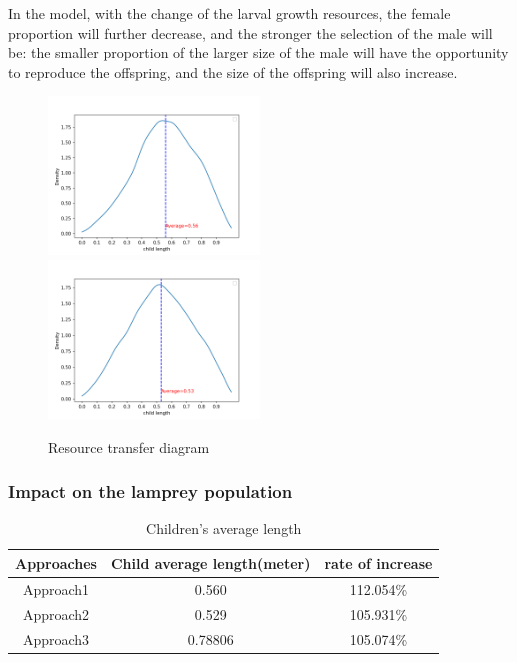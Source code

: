 \documentclass[12pt]{article}
\begin{document}
In the model, with the change of the larval growth resources, the female proportion will
further decrease, and the stronger the selection of the male will be: the smaller proportion
of the larger size of the male will have the opportunity to reproduce the offspring, and the
size of the offspring will also increase.
\begin{figure}[h]
	\centering
	\includegraphics[width=0.5\textwidth]{Q2_1.png}
	\includegraphics[width=0.5\textwidth]{Q2_2.png}

	\caption{Resource transfer diagram}
\end{figure}
\subsubsection{Impact on the lamprey population }
\begin{table}
	\centering
	\begin{tabular}{ |c |c |c|}
		\hline
		Approaches & Child average length(meter) & rate of increase\\
		\hline
		Approach1  & 0.560  &       112.054\%           \\
		\hline
		Approach2  & 0.529   &      105.931\%           \\
		\hline
		Approach3  & 0.78806     &   105.074\%             \\
		\hline
	\end{tabular}

	\caption{Children's average length}
\end{table}
\end{document}
